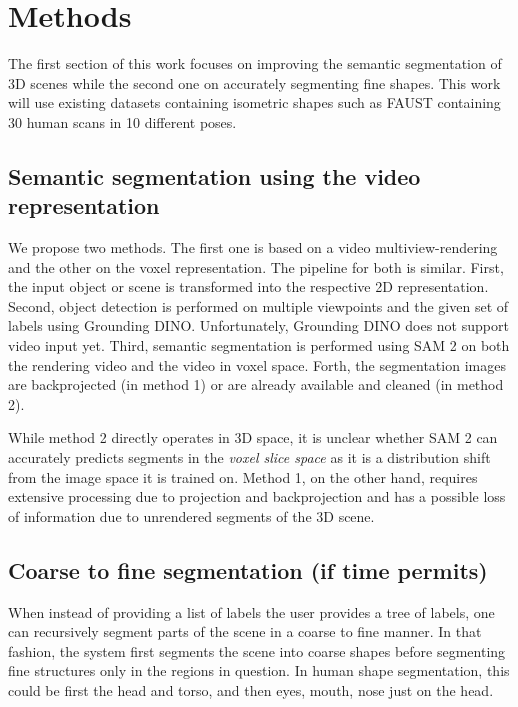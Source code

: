\section{Methods}
\label{sec:methods}

The first section of this work focuses on improving the semantic segmentation of 3D scenes while the second one on accurately segmenting fine shapes. This work will use existing datasets containing isometric shapes such as FAUST \citep{bogo_faust_2014} containing 30 human scans in 10 different poses.

\subsection{Semantic segmentation using the video representation}

We propose two methods. The first one is based on a video multiview-rendering and the other on the voxel representation. The pipeline for both is similar.
First, the input object or scene is transformed into the respective 2D representation. Second, object detection is performed on multiple viewpoints and the given set of labels using Grounding DINO. Unfortunately, Grounding DINO does not support video input yet. Third, semantic segmentation is performed using SAM 2 on both the rendering video and the video in voxel space. Forth, the segmentation images are backprojected (in method 1) or are already available and cleaned (in method 2).

While method 2 directly operates in 3D space, it is unclear whether SAM 2 can accurately predicts segments in the \textit{voxel slice space} as it is a distribution shift from the image space it is trained on. Method 1, on the other hand, requires extensive processing due to projection and backprojection and has a possible loss of information due to unrendered segments of the 3D scene. 

\subsection{Coarse to fine segmentation (if time permits)}

When instead of providing a list of labels the user provides a tree of labels, one can recursively segment parts of the scene in a coarse to fine manner. In that fashion, the system first segments the scene into coarse shapes before segmenting fine structures only in the regions in question. In human shape segmentation, this could be first the head and torso, and then eyes, mouth, nose just on the head.


